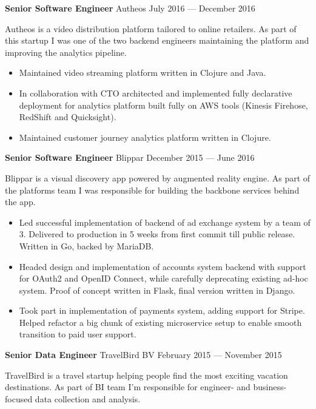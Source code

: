 \documentclass[margin]{res}
\begin{document}
\begin{resume}
{\bf Senior Software Engineer} Autheos \hfill July 2016 --- December 2016

Autheos is a video distribution platform tailored to online
retailers. As part of this startup I was one of the two backend
engineers maintaining the platform and improving the analytics
pipeline.

\begin{itemize} \itemsep -1pt
\item Maintained video streaming platform written in Clojure and Java.
\item In collaboration with CTO architected and implemented fully
  declarative deployment for analytics platform built fully on AWS
  tools (Kinesis Firehose, RedShift and Quicksight).
\item Maintained customer journey analytics platform written in
  Clojure.
\end{itemize}

{\bf Senior Software Engineer} Blippar \hfill December 2015 --- June 2016

Blippar is a visual discovery app powered by augmented reality
engine. As part of the platforms team I was responsible for building
the backbone services behind the app.

\begin{itemize} \itemsep -1pt
\item Led successful implementation of backend of ad exchange system
  by a team of 3. Delivered to production in 5 weeks from first commit
  till public release. Written in Go, backed by MariaDB.
\item Headed design and implementation of accounts system backend with
  support for OAuth2 and OpenID Connect, while carefully deprecating
  existing ad-hoc system. Proof of concept written in Flask, final
  version written in Django.
\item Took part in implementation of payments system, adding support
  for Stripe. Helped refactor a big chunk of existing microservice
  setup to enable smooth transition to paid user support.
\end{itemize}

{\bf Senior Data Engineer} TravelBird BV \hfill February 2015 --- November 2015

TravelBird is a travel startup helping people find the most exciting
vacation destinations. As part of BI team I'm responsible for
engineer- and business-focused data collection and analysis.\\


\end{resume}
\end{document}
